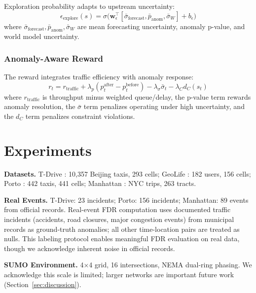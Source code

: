 \documentclass{article}
\theoremstyle{plain}
\theoremstyle{definition}
\theoremstyle{remark}
\begin{document}
Exploration probability adapts to upstream uncertainty:
\begin{equation}
\epsilon_{\text{explore}}(s) = \sigma\Big(\mathbf{w}_\epsilon^\top [\bar{\sigma}_{\text{forecast}}, \bar{p}_{\text{anom}}, \bar{\sigma}_W] + b_\epsilon\Big)
\label{eq:explore}
\end{equation}
where $\bar{\sigma}_{\text{forecast}}, \bar{p}_{\text{anom}}, \bar{\sigma}_W$ are mean forecasting uncertainty, anomaly p-value, and world model uncertainty.

\subsubsection{Anomaly-Aware Reward}

The reward integrates traffic efficiency with anomaly response:
\begin{equation}
r_t = r_{\text{traffic}} + \lambda_p (p_t^{\text{after}} - p_t^{\text{before}}) - \lambda_\sigma \bar{\sigma}_t - \lambda_C d_C(s_t)
\label{eq:reward}
\end{equation}
where $r_{\text{traffic}}$ is throughput minus weighted queue/delay, the p-value term rewards anomaly resolution, the $\bar{\sigma}$ term penalizes operating under high uncertainty, and the $d_C$ term penalizes constraint violations.

\section{Experiments}
\label{sec:experiments}

\textbf{Datasets.} T-Drive \citep{yuan2010t}: 10,357 Beijing taxis, 293 cells; GeoLife \citep{zheng2010geolife}: 182 users, 156 cells; Porto \citep{moreira2013predicting}: 442 taxis, 441 cells; Manhattan \citep{whong2014foil}: NYC trips, 263 tracts.

\textbf{Real Events.} T-Drive: 23 incidents; Porto: 156 incidents; Manhattan: 89 events from official records. Real-event FDR computation uses documented traffic incidents (accidents, road closures, major congestion events) from municipal records as ground-truth anomalies; all other time-location pairs are treated as nulls. This labeling protocol enables meaningful FDR evaluation on real data, though we acknowledge inherent noise in official records.

\textbf{SUMO Environment.} 4×4 grid, 16 intersections, NEMA dual-ring phasing. We acknowledge this scale is limited; larger networks are important future work (Section~\ref{sec:discussion}).
\end{document}
